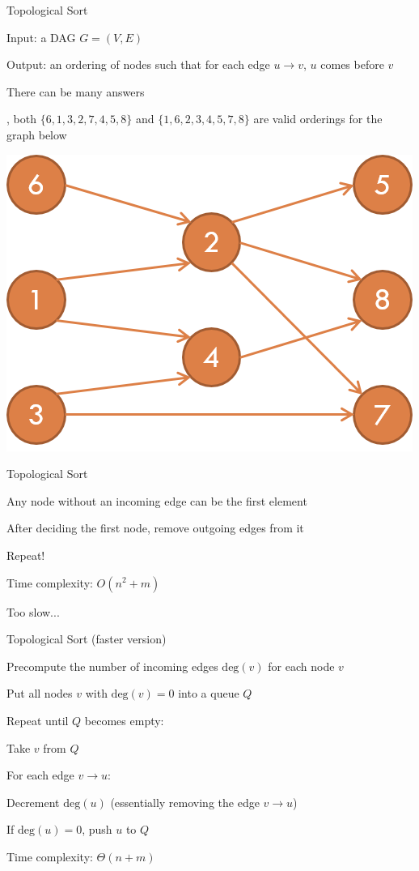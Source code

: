 \documentclass[13pt,onlymath]{beamer}
\begin{document}
\begin{frame}{Topological Sort}
\BIT
\item Input: a DAG $G = (V, E)$
\item Output: an ordering of nodes such that for each edge $u \rightarrow v$, $u$ comes before $v$
\item There can be many answers
\BIT
\item \eg, both $\{6, 1, 3, 2, 7, 4, 5, 8\}$ and $\{1, 6, 2, 3, 4, 5, 7, 8\}$ are valid orderings for the graph below
\EIT
\EIT
\begin{center}
\includegraphics[height=0.3\textheight]{figures/toposort}
\end{center}
\end{frame}

\begin{frame}{Topological Sort}
\BIT
\item Any node without an incoming edge can be the first element
\item After deciding the first node, remove outgoing edges from it
\item Repeat!
\vfill
\item Time complexity: $O(n^2 + m)$
\BIT
\item Too slow...
\EIT
\EIT
\end{frame}

\begin{frame}{Topological Sort (faster version)}
\BIT
\item Precompute the number of incoming edges $\mathrm{deg}(v)$ for each node $v$
\item Put all nodes $v$ with $\mathrm{deg}(v) = 0$ into a queue $Q$
\item Repeat until $Q$ becomes empty:
\BIT
\item Take $v$ from $Q$
\item For each edge $v \rightarrow u$:
\BIT
\item Decrement $\mathrm{deg}(u)$ (essentially removing the edge $v\rightarrow u$)
\item If $\mathrm{deg}(u) = 0$, push $u$ to $Q$
\EIT
\EIT
\item Time complexity: $\Theta(n+m)$
\EIT
\end{frame}
\end{document}
